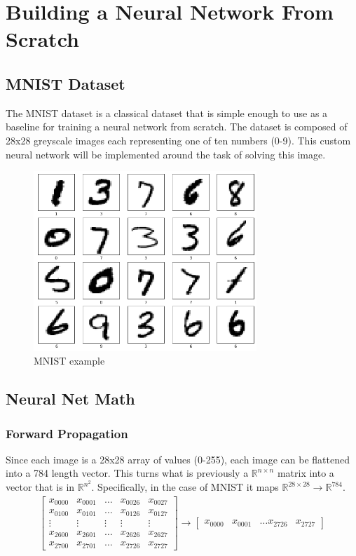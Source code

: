 \section{Building a Neural Network From Scratch}
\subsection{MNIST Dataset}
The MNIST dataset is a classical dataset that is simple enough to use as a baseline for training a neural network from scratch. The dataset is composed of 28x28 greyscale images each representing one of ten numbers (0-9). This custom neural network will be implemented around the task of solving this image.
\begin{figure}[htbp]
  \centerline{\includegraphics[width=0.75\textwidth]{images/mnist_example.png}}
  \caption{MNIST example}
  \label{fig:mnist_example}
\end{figure}

\subsection{Neural Net Math}
\subsubsection{Forward Propagation}
Since each image is a 28x28 array of values (0-255), each image can be flattened into a 784 length vector. This turns what is previously a $\mathbb{R}^{n\times n}$ matrix into a vector that is in $\mathbb{R}^{n^2}$. Specifically, in the case of MNIST it maps $\mathbb{R}^{28 \times 28} \to \mathbb{R}^{784}$.
\begin{align}
  \begin{bmatrix}
     x_{00 00} & x_{00 01} & \dots & x_{00 26}&  x_{00 27} \\
     x_{01 00} & x_{01 01} & \dots & x_{01 26}&  x_{01 27} \\
     \vdots & \vdots & \vdots & \vdots & \vdots \\
     x_{26 00} & x_{26 01} & \dots & x_{26 26}&  x_{26 27} \\
     x_{27 00} & x_{27 01} & \dots & x_{27 26}&  x_{27 27}
  \end{bmatrix}
  \to
  \begin{bmatrix}
    x_{00 00} & x_{00 01} & \dots x_{27 26}&  x_{27 27} 
 \end{bmatrix}
\end{align}

